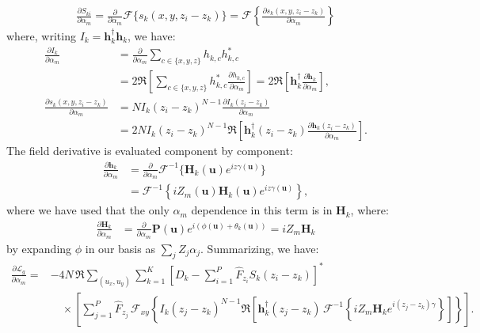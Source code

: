 \documentclass{article}
\begin{document}
\begin{align}
\frac{\partial S_{ki}}{\partial \alpha_m} = \frac{\partial}{\partial \alpha_m} \mathcal{F} \{s_k(x, y, z_i - z_k) \} = \mathcal{F} \left\{ \frac{\partial s_k(x, y, z_i - z_k)}{\partial \alpha_m} \right\}
\end{align}
where, writing $I_k=\mathbf{h}_k^\dagger\mathbf{h}_k$, we have:
\begin{align}
\frac{\partial I_k}{\partial \alpha_m}
&= \frac{\partial}{\partial \alpha_m}
\sum_{c\in\{x,y,z\}} h_{k,c}h_{k,c}^* \\
&= 2\Re\left[\sum_{c\in\{x,y,z\}}
h_{k,c}^*\frac{\partial h_{k,c}}{\partial\alpha_m}\right]
=2\Re\left[\mathbf{h}_k^\dagger
\frac{\partial\mathbf{h}_k}{\partial\alpha_m}\right], \\
\frac{\partial s_k(x,y,z_i-z_k)}{\partial\alpha_m}
&= N I_k(z_i-z_k)^{N-1}
\frac{\partial I_k(z_i-z_k)}{\partial\alpha_m} \\
&= 2N I_k(z_i-z_k)^{N-1}
\Re\left[\mathbf{h}_k^\dagger(z_i-z_k)
\frac{\partial\mathbf{h}_k(z_i-z_k)}{\partial\alpha_m}\right].
\end{align}
The field derivative is evaluated component by component:
\begin{align}
\frac{\partial\mathbf{h}_k}{\partial\alpha_m}
&= \frac{\partial}{\partial\alpha_m}
\mathcal F^{-1}\{\mathbf H_k(\mathbf u)e^{iz\gamma(\mathbf u)}\} \\
&= \mathcal F^{-1}\left\{iZ_m(\mathbf u)\mathbf H_k(\mathbf u)e^{iz\gamma(\mathbf u)}\right\},
\end{align}
where we have used that the only $\alpha_m$ dependence in this term is in $\mathbf H_k$, where:
\begin{align}
\frac{\partial\mathbf H_k}{\partial\alpha_m}
&= \frac{\partial}{\partial\alpha_m}
\mathbf P(\mathbf u)e^{i(\phi(\mathbf u)+\theta_k(\mathbf u))}
=iZ_m\mathbf H_k
\end{align}
by expanding $\phi$ in our basis as $\sum_j Z_j \alpha_j$. Summarizing, we have:
\begin{equation}
\begin{aligned}
\frac{\partial \mathcal{L}_g}{\partial \alpha_m} ={}& -4N\,\Re \sum_{(u_x,u_y)} \sum_{k=1}^{K} \left[D_k-\sum_{i=1}^{P}\hat{F}_{z_i}S_k(z_i-z_k)\right]^*
\\&\quad\times\left[\sum_{j=1}^{P}\hat{F}_{z_j}\,\mathcal{F}_{xy}\left\{I_k(z_j-z_k)^{N-1}
\Re\left[\mathbf h_k^\dagger(z_j-z_k)\,
\mathcal{F}^{-1}\left\{iZ_m\mathbf H_k e^{i(z_j-z_k)\gamma}\right\}\right]\right\}\right].
\end{aligned}
\end{equation}
\end{document}
